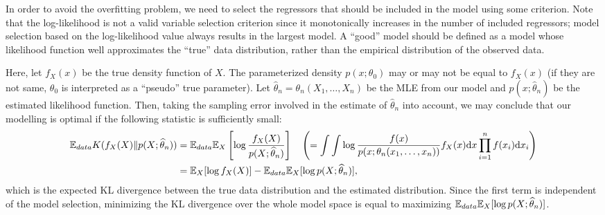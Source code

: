 \documentclass[11pt, A4paper, openany, uplatex]{book}
\begin{document}
In order to avoid the overfitting problem, we need to select the regressors that should be included in the model using some criterion.
Note that the log-likelihood is not a valid variable selection criterion since it monotonically increases in the number of included regressors; model selection based on the log-likelihood value always results in the largest model.
A ``good'' model should be defined as a model whose likelihood function well approximates the ``true'' data distribution, rather than the empirical distribution of the observed data.
\bigskip

Here, let $f_X(x)$ be the true density function of $X$.
The parameterized density $p(x; \theta_0)$ may or may not be equal to $f_X(x)$ (if they are not same, $\theta_0$ is interpreted as a ``pseudo'' true parameter).
Let $\hat \theta_n = \theta_n(X_1, \ldots, X_n)$ be the MLE from our model and $p(x; \hat \theta_n)$ be the estimated likelihood function.
Then, taking the sampling error involved in the estimate of $\hat \theta_n$ into account, we may conclude that our modelling is optimal if the following statistic is sufficiently small:
\begin{align*}
		\mathbb{E}_{data} K( f_X(X) \| p(X; \widehat \theta_n) )
		& = \mathbb{E}_{data} \mathbb{E}_X\left[ \log \frac{f_X(X)}{p(X; \widehat \theta_n)} \right] \quad \left(=\int\int \log \frac{f(x)}{p(x; \theta_n(x_1, \ldots, x_n))} f_X(x)\mathrm{d}x \prod_{i=1}^n f(x_i) \mathrm{d}x_i \right)\\
		& = \mathbb{E}_X[\log f_X(X)] - \mathbb{E}_{data} \mathbb{E}_X[\log p(X; \widehat \theta_n)],
\end{align*}
which is the expected KL divergence between the true data distribution and the estimated distribution.
Since the first term is independent of the model selection, minimizing the KL divergence over the whole model space is equal to maximizing $\mathbb{E}_{data} \mathbb{E}_X[\log p(X; \widehat \theta_n)]$.
\end{document}

